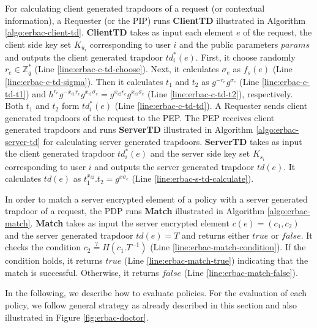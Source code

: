 \documentclass[epsfig,a4paper,11pt,titlepage]{book}
\numberwithin{algorithm}{chapter}
\begin{document}
For calculating client generated trapdoors of a request (or contextual information), a Requester (or the \gls{PIP}) runs \textbf{ClientTD} illustrated in Algorithm \ref{algo:erbac-client-td}. \textbf{ClientTD} takes as input each element $e$ of the request, the client side key set $K_{u_i}$ corresponding to user $i$ and the public parameters $params$ and outputs the client generated trapdoor $td^*_i (e)$. First, it choose randomly $r_{e} \in \mathbb{Z}^*_q$ (Line \ref{line:erbac-c-td-choose}). Next, it calculates ${\sigma}_{e}$ as $f_s (e)$ (Line \ref{line:erbac-c-td-sigma}). Then it calculates $t_1$ and $t_2$ as $g^{-r_{e}} g^{{\sigma}_{e}}$ (Line \ref{line:erbac-c-td-t1}) and $h^{r_{e}} g^{-x_{i1}r_{e}} g^{x_{i1}{\sigma}_{e}} = g^{x_{i2}r_{e}} g^{x_{i1}{\sigma}_{e}}$ (Line \ref{line:erbac-c-td-t2}), respectively. Both $t_1$ and $t_2$ form $td^*_i (e)$ (Line \ref{line:erbac-c-td-td}). A Requester sends client generated trapdoors of the request to the \gls{PEP}.
The \gls{PEP} receives client generated trapdoors and runs \textbf{ServerTD} illustrated in Algorithm \ref{algo:erbac-server-td} for calculating server generated trapdoors. \textbf{ServerTD} takes as input the client generated trapdoor $td^*_i (e)$ and the server side key set $K_{s_i}$ corresponding to user $i$ and outputs the server generated trapdoor $td(e)$. It calculates $td(e)$ as  $t_1^{x_{i2}} . t_2 = g^{x{\sigma}_{e}}$ (Line \ref{line:erbac-s-td-calculate}).

In order to match a server encrypted element of a policy with a server generated trapdoor of a request, the \gls{PDP} runs \textbf{Match} illustrated in Algorithm \ref{algo:erbac-match}. \textbf{Match} takes as input the server encrypted element $c(e) = (c_1, c_2)$ and the server generated trapdoor $td(e) = T$ and returns either $\mathit{true}$ or $\mathit{false}$. It checks the condition $c_2 \stackrel{?}{=} H(c_1 . T^{-1})$ (Line \ref{line:erbac-match-condition}). If the condition holds, it returns $\mathit{true}$ (Line \ref{line:erbac-match-true}) indicating that the match is successful. Otherwise, it returns $\mathit{false}$ (Line \ref{line:erbac-match-false}). 

In the following, we describe how to evaluate policies. For the evaluation of each policy, we follow general strategy as already described in this section and also illustrated in Figure \ref{fig:erbac-doctor}.
\end{document}
